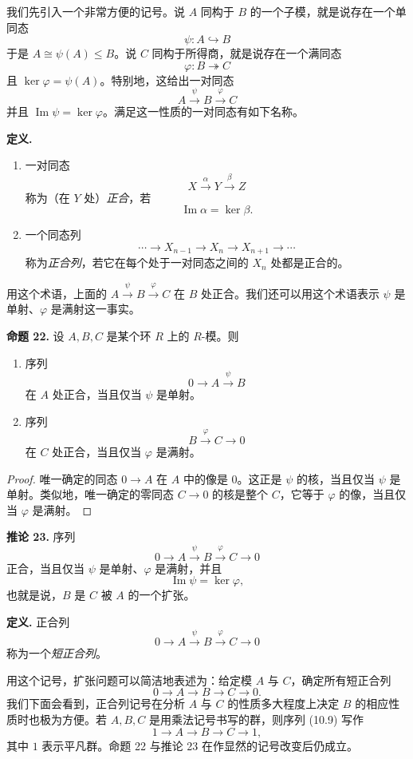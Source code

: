 我们先引入一个非常方便的记号。说 $A$ 同构于 $B$ 的一个子模，就是说存在一个单同态
\[
\psi:A\hookrightarrow B
\]
于是 $A\cong \psi(A)\leq B$。说 $C$ 同构于所得商，就是说存在一个满同态
\[
\varphi:B\twoheadrightarrow C
\]
且 $\ker\varphi=\psi(A)$。特别地，这给出一对同态
\[
A\xrightarrow{\psi}B\xrightarrow{\varphi}C
\]
并且 $\operatorname{Im}\psi=\ker\varphi$。满足这一性质的一对同态有如下名称。

\noindent\textbf{定义.}
\begin{enumerate}[label=(\arabic*)]
\item 一对同态
\[
X\xrightarrow{\alpha}Y\xrightarrow{\beta}Z
\]
称为（在 $Y$ 处）\emph{正合}，若
\[
\operatorname{Im}\alpha=\ker\beta.
\]
\item 一个同态列
\[
\cdots\longrightarrow X_{n-1}\longrightarrow X_n\longrightarrow X_{n+1}\longrightarrow\cdots
\]
称为\emph{正合列}，若它在每个处于一对同态之间的 $X_n$ 处都是正合的。
\end{enumerate}

用这个术语，上面的 $A\xrightarrow{\psi}B\xrightarrow{\varphi}C$ 在 $B$ 处正合。我们还可以用这个术语表示 $\psi$ 是单射、$\varphi$ 是满射这一事实。

\noindent\textbf{命题 22.} 设 $A,B,C$ 是某个环 $R$ 上的 $R$-模。则
\begin{enumerate}[label=(\arabic*)]
\item 序列
\[
0\longrightarrow A\xrightarrow{\psi}B
\]
在 $A$ 处正合，当且仅当 $\psi$ 是单射。
\item 序列
\[
B\xrightarrow{\varphi}C\longrightarrow0
\]
在 $C$ 处正合，当且仅当 $\varphi$ 是满射。
\end{enumerate}

\begin{proof}
唯一确定的同态 $0\to A$ 在 $A$ 中的像是 $0$。这正是 $\psi$ 的核，当且仅当 $\psi$ 是单射。类似地，唯一确定的零同态 $C\to0$ 的核是整个 $C$，它等于 $\varphi$ 的像，当且仅当 $\varphi$ 是满射。
\end{proof}

\noindent\textbf{推论 23.} 序列
\[
0\longrightarrow A\xrightarrow{\psi}B\xrightarrow{\varphi}C\longrightarrow0
\]
正合，当且仅当 $\psi$ 是单射、$\varphi$ 是满射，并且
\[
\operatorname{Im}\psi=\ker\varphi,
\]
也就是说，$B$ 是 $C$ 被 $A$ 的一个扩张。

\noindent\textbf{定义.} 正合列
\[
0\longrightarrow A\xrightarrow{\psi}B\xrightarrow{\varphi}C\longrightarrow0
\]
称为一个\emph{短正合列}。

用这个记号，扩张问题可以简洁地表述为：给定模 $A$ 与 $C$，确定所有短正合列
\[
0\longrightarrow A\longrightarrow B\longrightarrow C\longrightarrow0.
\tag{10.9}
\]
我们下面会看到，正合列记号在分析 $A$ 与 $C$ 的性质多大程度上决定 $B$ 的相应性质时也极为方便。若 $A,B,C$ 是用乘法记号书写的群，则序列 (10.9) 写作
\[
1\longrightarrow A\longrightarrow B\longrightarrow C\longrightarrow1,
\tag{10.9'}
\]
其中 $1$ 表示平凡群。命题 22 与推论 23 在作显然的记号改变后仍成立。

